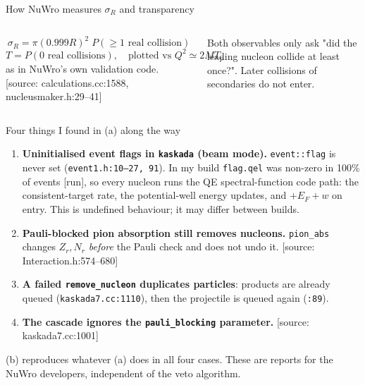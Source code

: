 \documentclass[10pt,aspectratio=169]{beamer}
\newcommand{\code}[1]{{\small\texttt{#1}}}
\newcommand{\tagrun}{{\scriptsize\color{okGreen}[run]}}
\newcommand{\tagsrc}[1]{{\scriptsize\color{aBlue}[source: #1]}}
\begin{document}
\begin{frame}{How NuWro measures $\sigma_R$ and transparency}
\begin{columns}[c]
\centering
{}
\[
\sigma_R=\pi(0.999R)^2\;P(\ge1\text{ real collision})
\]
\[
T=P(0\text{ real collisions}),\quad \text{plotted vs }Q^2\simeq2M T_p
\]
as in NuWro's own validation code. \tagsrc{calculations.cc:1588, nucleusmaker.h:29--41}\\[4pt]
\begin{keybox}
Both observables only ask "did the leading nucleon collide at least once?". Later collisions of secondaries do not enter.
\end{keybox}
\end{columns}
\end{frame}

\begin{frame}{Four things I found in (a) along the way}
\begin{enumerate}
\item \textbf{Uninitialised event flags in \code{kaskada} (beam mode).} \code{event::flag} is never set (\code{event1.h:10--27, 91}). In my build \code{flag.qel} was non-zero in 100\% of events \tagrun, so every nucleon runs the QE spectral-function code path: the consistent-target rate, the potential-well energy updates, and $+E_F+w$ on entry. This is undefined behaviour; it may differ between builds.
\item \textbf{Pauli-blocked pion absorption still removes nucleons.} \code{pion\_abs} changes $Z_r,N_r$ \emph{before} the Pauli check and does not undo it. \tagsrc{Interaction.h:574--680}
\item \textbf{A failed \code{remove\_nucleon} duplicates particles}: products are already queued (\code{kaskada7.cc:1110}), then the projectile is queued again (\code{:89}).
\item \textbf{The cascade ignores the \code{pauli\_blocking} parameter.} \tagsrc{kaskada7.cc:1001}
\end{enumerate}
\begin{keybox}
(b) reproduces whatever (a) does in all four cases. These are reports for the NuWro developers, independent of the veto algorithm.
\end{keybox}
\end{frame}
\end{document}
